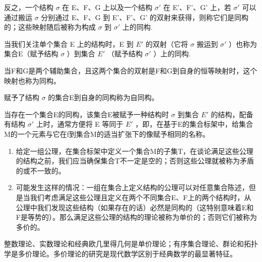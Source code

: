 反之，一个结构 \(\sigma\) 在 E、F、G 上以及一个结构 \(\sigma'\) 在 E'、F'、G' 上，若 \(\sigma'\) 可以通过搬运 \(\sigma\) 分别通过 E、F、G 到 E'、F'、G' 的双射来获得，则称它们是同构的；这些映射随后被称为构成 \(\sigma\) 到 \(\sigma'\) 上的同构.

当我们关注单个集合 E 上的结构时，E 到 \(E'\) 的双射（它将 \(\sigma\) 搬运到 \(\sigma'\) ）也称为集合E（赋予结构 \(\sigma\) ）到集合 \(E'\) （赋予结构 \(\sigma'\) ）上的同构.

当F和G是两个辅助集合，且这两个集合的双射是F和G到自身的恒等映射时，这个映射也称为同构。

赋予了结构 \(\sigma\) 的集合E到自身的同构称为自同构。

当存在一个集合E的同构，该集合E被赋予一种结构时 \(\sigma\) 到集合 \(E'\) 的结构，配备有结构 \(\sigma'\) 上时，通常方便将 E 等同于 \(E'\) ，即，在基于E的集合标架中，给集合M的一个元素与它在f到集合M的适当扩张下的像赋予相同的名称。

\begin{enumerate}
\def\labelenumi{\arabic{enumi}.}
\setcounter{enumi}{5}
\item
  给定一组公理，在集合标架中定义一个集合M的子集T，在谈论满足这些公理的结构之前，我们应当确保集合T不一定是空的；否则这些公理就被称为矛盾的或不一致的。
\item
  可能发生这样的情况：一组在集合上定义结构的公理可以对任意集合陈述，但是当我们考虑满足这些公理且定义在两个不同集合E、F上的两个结构时，从公理中我们发现这些结构（如果存在的话）必然是同构的（这特别意味着E和F是等势的）。那么满足这些公理的结构的理论被称为单价的；否则它们被称为多价的。
\end{enumerate}

整数理论、实数理论和经典欧几里得几何是单价理论；有序集合理论、群论和拓扑学是多价理论。多价理论的研究是现代数学区别于经典数学的最显著特征。

